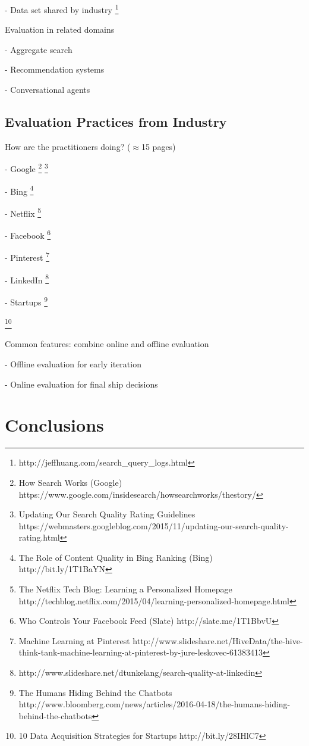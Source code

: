 \documentclass[openany]{now} %
\newcommand{\newpar}{\bigskip\noindent}
\begin{document}
- Data set shared by industry \footnote{http://jeffhuang.com/search\_query\_logs.html}

\newpar
Evaluation in related domains

- Aggregate search \cite{Zhou:2013}

- Recommendation systems \cite{gunawardana2015evaluating}

- Conversational agents

\section{Evaluation Practices from Industry}

How are the practitioners doing? (\ensuremath{\approx}15 pages)

- Google \footnote{How Search Works (Google) https://www.google.com/insidesearch/howsearchworks/thestory/} \footnote{Updating Our Search Quality Rating Guidelines
	 https://webmasters.googleblog.com/2015/11/updating-our-search-quality-rating.html}

- Bing \footnote{The Role of Content Quality in Bing Ranking (Bing)
	 http://bit.ly/1T1BaYN}

- Netflix \cite{Gomez-Uribe2015}  \footnote{The Netflix Tech Blog: Learning a Personalized Homepage
	http://techblog.netflix.com/2015/04/learning-personalized-homepage.html}

- Facebook \footnote{Who Controls Your Facebook Feed (Slate) http://slate.me/1T1BbvU}

- Pinterest \footnote{Machine Learning at Pinterest http://www.slideshare.net/HiveData/the-hive-think-tank-machine-learning-at-pinterest-by-jure-leskovec-61383413}

- LinkedIn \footnote{http://www.slideshare.net/dtunkelang/search-quality-at-linkedin}

- Startups \footnote{The Humans Hiding Behind the Chatbots http://www.bloomberg.com/news/articles/2016-04-18/the-humans-hiding-behind-the-chatbots}

\footnote{10 Data Acquisition Strategies for Startups http://bit.ly/28IHlC7}

\newpar
Common features: combine online and offline evaluation

- Offline evaluation for early iteration

- Online evaluation for final ship decisions

\chapter{Conclusions}
\end{document}
